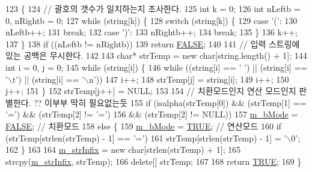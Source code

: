 \begin{DoxyCode}
123                                      \{
124     \textcolor{comment}{// 괄호의 갯수가 일치하는지 조사한다.}
125     \textcolor{keywordtype}{int} k = 0;
126     \textcolor{keywordtype}{int} nLeftb = 0, nRightb = 0;
127     \textcolor{keywordflow}{while} (\textcolor{keywordtype}{string}[k]) \{
128         \textcolor{keywordflow}{switch} (\textcolor{keywordtype}{string}[k]) \{
129         \textcolor{keywordflow}{case} \textcolor{charliteral}{'('}:
130             nLeftb++;
131             \textcolor{keywordflow}{break};
132         \textcolor{keywordflow}{case} \textcolor{charliteral}{')'}:
133             nRightb++;
134             \textcolor{keywordflow}{break};
135         \}
136         k++;
137     \}
138     \textcolor{keywordflow}{if} ((nLeftb != nRightb))
139         \textcolor{keywordflow}{return} \hyperlink{_calculate_8h_a3e5b8192e7d9ffaf3542f1210aec18ddaa1e095cc966dbecf6a0d8aad75348d1a}{FALSE};
140 
141     \textcolor{comment}{// 입력 스트링에 있는 공백은 무시한다.}
142 
143     \textcolor{keywordtype}{char}* strTemp = \textcolor{keyword}{new} \textcolor{keywordtype}{char}[\textcolor{keywordtype}{string}.length() + 1];
144     \textcolor{keywordtype}{int} i = 0, j = 0;
145     \textcolor{keywordflow}{while} (\textcolor{keywordtype}{string}[i]) \{
146         \textcolor{keywordflow}{while} ((\textcolor{keywordtype}{string}[i] == \textcolor{charliteral}{' '}) || (\textcolor{keywordtype}{string}[i] == \textcolor{charliteral}{'\(\backslash\)t'}) || (\textcolor{keywordtype}{string}[i] == \textcolor{charliteral}{'\(\backslash\)n'}))
147             i++;
148         strTemp[j] = \textcolor{keywordtype}{string}[i];
149         i++;
150         j++;
151     \}
152     strTemp[j++] = NULL;
153 
154     \textcolor{comment}{// 치환모드인지 연산 모드인지 판별한다. ?? 이부부 딱히 필요없는듯}
155     \textcolor{keywordflow}{if} (isalpha(strTemp[0]) && (strTemp[1] == \textcolor{charliteral}{'='}) && (strTemp[2] != \textcolor{charliteral}{'='})
156             && (strTemp[2] != NULL))
157         \hyperlink{class_calculate_a91ed53268a8f29f54757037bc28d35e0}{m\_bMode} = \hyperlink{_calculate_8h_a3e5b8192e7d9ffaf3542f1210aec18ddaa1e095cc966dbecf6a0d8aad75348d1a}{FALSE}; \textcolor{comment}{// 치환모드}
158     \textcolor{keywordflow}{else} \{
159         \hyperlink{class_calculate_a91ed53268a8f29f54757037bc28d35e0}{m\_bMode} = \hyperlink{_calculate_8h_a3e5b8192e7d9ffaf3542f1210aec18ddaa82764c3079aea4e60c80e45befbb839}{TRUE}; \textcolor{comment}{// 연산모드}
160         \textcolor{keywordflow}{if} (strTemp[strlen(strTemp) - 1] == \textcolor{charliteral}{'='})
161             strTemp[strlen(strTemp) - 1] = \textcolor{charliteral}{'\(\backslash\)0'};
162     \}
163 
164     \hyperlink{class_calculate_a1b964b49f9a186fa02643c1361ccd4ab}{m\_strInfix} = \textcolor{keyword}{new} \textcolor{keywordtype}{char}[strlen(strTemp) + 1];
165     strcpy(\hyperlink{class_calculate_a1b964b49f9a186fa02643c1361ccd4ab}{m\_strInfix}, strTemp);
166     \textcolor{keyword}{delete}[] strTemp;
167 
168     \textcolor{keywordflow}{return} \hyperlink{_calculate_8h_a3e5b8192e7d9ffaf3542f1210aec18ddaa82764c3079aea4e60c80e45befbb839}{TRUE};
169 \}
\end{DoxyCode}
